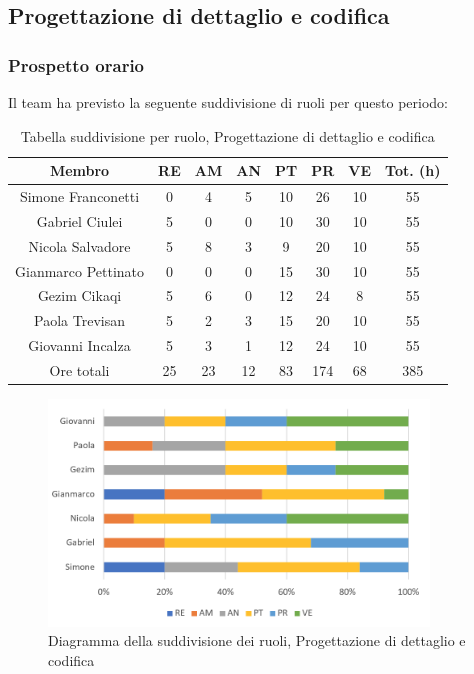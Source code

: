 \subsection{Progettazione di dettaglio e codifica}
\subsubsection{Prospetto orario}
Il team ha previsto la seguente suddivisione di ruoli per questo periodo:
\FloatBarrier
\begin{table}[h]
\caption{Tabella suddivisione per ruolo, Progettazione di dettaglio e codifica}
\begin{center}
\begin{tabular}{ |c|c|c|c|c|c|c|c|  }
 \hline
 Membro 		& RE 	& AM 	& AN 	& PT 	& PR 	& VE 	& Tot. (h)\\
 \hline\hline
 Simone	Franconetti		& 0 		& 4		& 5 	& 10 	& 26 		& 10 		& 55\\
 Gabriel Ciulei		& 5 		& 0 		& 0 	& 10		& 30 		& 10 		& 55\\
 Nicola	Salvadore		& 5 		& 8 		& 3 	& 9 		& 20 		& 10 		& 55\\
 Gianmarco	Pettinato	& 0 		& 0 		& 0 	& 15 	& 30 		& 10 		& 55\\
 Gezim	Cikaqi		& 5 		& 6 		& 0 	& 12 	& 24 		& 8	 		& 55\\
 Paola	Trevisan		& 5 		& 2 		& 3 	& 15 	& 20 		& 10 		& 55\\
 Giovanni	Incalza	& 5 		& 3	 	& 1 	& 12 	& 24 		& 10  		& 55\\
 \hline\hline
 Ore totali		& 25		& 23		& 12 	& 83	 	& 174 	& 68 	& 385\\
  \hline
\end{tabular}
\end{center}
\end{table}
\FloatBarrier
\FloatBarrier
\begin{figure}[h!]
	\centering
	\includegraphics[width=0.9\textwidth]{res/img/hi33}
	\caption{Diagramma della suddivisione dei ruoli, Progettazione di dettaglio e codifica}
\end{figure}
